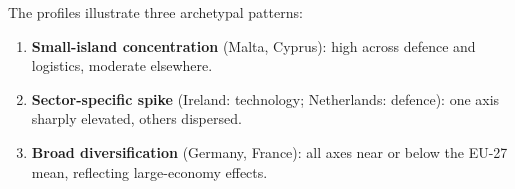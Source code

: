 The profiles illustrate three archetypal patterns:
\begin{enumerate}[leftmargin=2em]
  \item \textbf{Small-island concentration} (Malta, Cyprus): high
    across defence and logistics, moderate elsewhere.
  \item \textbf{Sector-specific spike} (Ireland: technology;
    Netherlands: defence): one axis sharply elevated, others
    dispersed.
  \item \textbf{Broad diversification} (Germany, France): all axes
    near or below the EU-27 mean, reflecting large-economy effects.
\end{enumerate}
